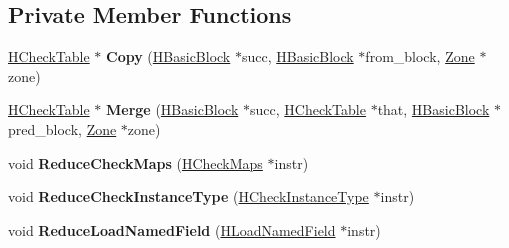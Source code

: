 \subsection*{Private Member Functions}
\begin{DoxyCompactItemize}
\item 
\hyperlink{classv8_1_1internal_1_1_h_check_table}{H\+Check\+Table} $\ast$ {\bfseries Copy} (\hyperlink{classv8_1_1internal_1_1_h_basic_block}{H\+Basic\+Block} $\ast$succ, \hyperlink{classv8_1_1internal_1_1_h_basic_block}{H\+Basic\+Block} $\ast$from\+\_\+block, \hyperlink{classv8_1_1internal_1_1_zone}{Zone} $\ast$zone)\hypertarget{classv8_1_1internal_1_1_h_check_table_a8b4207dbc06eaba6af0397f5ba1324ed}{}\label{classv8_1_1internal_1_1_h_check_table_a8b4207dbc06eaba6af0397f5ba1324ed}

\item 
\hyperlink{classv8_1_1internal_1_1_h_check_table}{H\+Check\+Table} $\ast$ {\bfseries Merge} (\hyperlink{classv8_1_1internal_1_1_h_basic_block}{H\+Basic\+Block} $\ast$succ, \hyperlink{classv8_1_1internal_1_1_h_check_table}{H\+Check\+Table} $\ast$that, \hyperlink{classv8_1_1internal_1_1_h_basic_block}{H\+Basic\+Block} $\ast$pred\+\_\+block, \hyperlink{classv8_1_1internal_1_1_zone}{Zone} $\ast$zone)\hypertarget{classv8_1_1internal_1_1_h_check_table_a41f2fd2921e32d70bce30b3b0093255b}{}\label{classv8_1_1internal_1_1_h_check_table_a41f2fd2921e32d70bce30b3b0093255b}

\item 
void {\bfseries Reduce\+Check\+Maps} (\hyperlink{classv8_1_1internal_1_1_h_check_maps}{H\+Check\+Maps} $\ast$instr)\hypertarget{classv8_1_1internal_1_1_h_check_table_a9523b3f9282907b99dcc609480422481}{}\label{classv8_1_1internal_1_1_h_check_table_a9523b3f9282907b99dcc609480422481}

\item 
void {\bfseries Reduce\+Check\+Instance\+Type} (\hyperlink{classv8_1_1internal_1_1_h_check_instance_type}{H\+Check\+Instance\+Type} $\ast$instr)\hypertarget{classv8_1_1internal_1_1_h_check_table_a01fb07f2687039ce9958589265cc5a76}{}\label{classv8_1_1internal_1_1_h_check_table_a01fb07f2687039ce9958589265cc5a76}

\item 
void {\bfseries Reduce\+Load\+Named\+Field} (\hyperlink{classv8_1_1internal_1_1_h_load_named_field}{H\+Load\+Named\+Field} $\ast$instr)\hypertarget{classv8_1_1internal_1_1_h_check_table_af054c9cb2b3fb5412de3ac1b5acede64}{}\label{classv8_1_1internal_1_1_h_check_table_af054c9cb2b3fb5412de3ac1b5acede64}


\end{DoxyCompactItemize}
